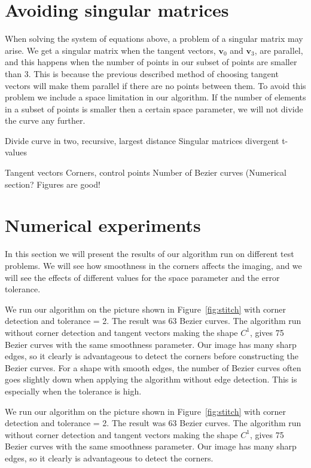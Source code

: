 \documentclass[10pt]{article}
\begin{document}
\section*{Avoiding singular matrices}
When solving the system of equations above, a problem of a singular matrix may arise. We get a singular matrix when the tangent vectors, $\mathbf{v}_0$ and $\mathbf{v}_3$, are parallel, and this happens when the number of points in our subset of points are smaller than 3. This is because the previous described method of choosing tangent vectors will make them parallel if there are no points between them. To avoid this problem we include a space limitation in our algorithm. If the number of elements in a subset of points is smaller then a certain space parameter, we will not divide the curve any further.


Divide curve in two, recursive, largest distance
Singular matrices
divergent t-values


Tangent vectors
Corners, control points
Number of Bezier curves (Numerical section?
Figures are good!


\section{Numerical experiments}

In this section we will present the results of our algorithm run on different test problems. We will see how smoothness in the corners affects the imaging, and we will see the effects of different values for the space parameter and the error tolerance.


We run our algorithm on the picture shown in Figure~\ref{fig:stitch} with corner detection and tolerance = 2. The result was 63 Bezier curves. The algorithm run without corner detection and tangent vectors making the shape $C^1$, gives 75 Bezier curves with the same smoothness parameter. Our image has many sharp edges, so it clearly is advantageous to detect the corners before constructing the Bezier curves. For a shape with smooth edges, the number of Bezier curves often goes slightly down when applying the algorithm without edge detection. This is especially when the tolerance is high.  

We run our algorithm on the picture shown in Figure~\ref{fig:stitch} with corner detection and tolerance = 2. The result was 63 Bezier curves. The algorithm run without corner detection and tangent vectors making the shape $C^1$, gives 75 Bezier curves with the same smoothness parameter. Our image has many sharp edges, so it clearly is advantageous to detect the corners.
\end{document}
